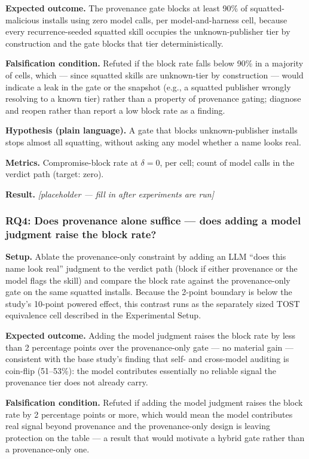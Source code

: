 \documentclass[11pt]{article}
\newcommand{\ph}{\textit{[placeholder --- fill in after experiments are run]}}
\begin{document}
\textbf{Expected outcome.} The provenance gate blocks at least 90\% of squatted-malicious installs using zero model calls, per model-and-harness cell, because every recurrence-seeded squatted skill occupies the unknown-publisher tier by construction and the gate blocks that tier deterministically.

\textbf{Falsification condition.} Refuted if the block rate falls below 90\% in a majority of cells, which --- since squatted skills are unknown-tier by construction --- would indicate a leak in the gate or the snapshot (e.g., a squatted publisher wrongly resolving to a known tier) rather than a property of provenance gating; diagnose and reopen rather than report a low block rate as a finding.

\textbf{Hypothesis (plain language).} A gate that blocks unknown-publisher installs stops almost all squatting, without asking any model whether a name looks real.

\textbf{Metrics.} Compromise-block rate at $\delta = 0$, per cell; count of model calls in the verdict path (target: zero).

\textbf{Result.} \ph

\subsubsection{RQ4: Does provenance alone suffice --- does adding a model judgment raise the block rate?}
\textbf{Setup.} Ablate the provenance-only constraint by adding an LLM ``does this name look real'' judgment to the verdict path (block if either provenance or the model flags the skill) and compare the block rate against the provenance-only gate on the same squatted installs. Because the 2-point boundary is below the study's 10-point powered effect, this contrast runs as the separately sized TOST equivalence cell described in the Experimental Setup.

\textbf{Expected outcome.} Adding the model judgment raises the block rate by less than 2 percentage points over the provenance-only gate --- no material gain --- consistent with the base study's finding that self- and cross-model auditing is coin-flip (51--53\%): the model contributes essentially no reliable signal the provenance tier does not already carry.

\textbf{Falsification condition.} Refuted if adding the model judgment raises the block rate by 2 percentage points or more, which would mean the model contributes real signal beyond provenance and the provenance-only design is leaving protection on the table --- a result that would motivate a hybrid gate rather than a provenance-only one.
\end{document}
